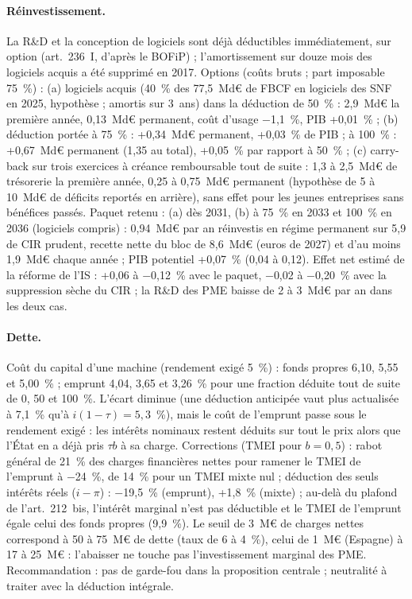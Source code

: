 \paragraph{Réinvestissement.} La R\&D et la conception de logiciels sont déjà déductibles immédiatement, sur option
(art.~236~I, d'après le BOFiP) ; l'amortissement sur douze mois des logiciels acquis a été supprimé en 2017. Options
(coûts bruts ; part imposable 75~\%) : (a) logiciels acquis (40~\% des 77,5~Md€ de FBCF en logiciels des SNF en 2025,
hypothèse ; amortis sur 3~ans) dans la déduction de 50~\% : 2,9~Md€ la première année, 0,13~Md€ permanent, coût d'usage
$-$1,1~\%, PIB +0,01~\% ; (b) déduction portée à 75~\% : +0,34~Md€ permanent, +0,03~\% de PIB ; à 100~\% : +0,67~Md€
permanent (1,35 au total), +0,05~\% par rapport à 50~\% ; (c) carry-back sur trois exercices à créance remboursable tout
de suite : 1,3 à 2,5~Md€ de trésorerie la première année, 0,25 à 0,75~Md€ permanent (hypothèse de 5 à 10~Md€ de déficits
reportés en arrière), sans effet pour les jeunes entreprises sans bénéfices passés. Paquet retenu : (a) dès 2031, (b) à
75~\% en 2033 et 100~\% en 2036 (logiciels compris) : 0,94~Md€ par an réinvestis en régime permanent sur 5,9 de CIR
prudent, recette nette du bloc de 8,6~Md€ (euros de 2027) et d'au moins 1,9~Md€ chaque année ; PIB potentiel +0,07~\%
(0,04 à 0,12). Effet net estimé de la réforme de l'IS : +0,06 à $-$0,12~\% avec le paquet, $-$0,02 à $-$0,20~\% avec la
suppression sèche du CIR ; la R\&D des PME baisse de 2 à 3~Md€ par an dans les deux cas.

\paragraph{Dette.} Coût du capital d'une machine (rendement exigé 5~\%) : fonds propres 6,10, 5,55 et 5,00~\% ; emprunt
4,04, 3,65 et 3,26~\% pour une fraction déduite tout de suite de 0, 50 et 100~\%. L'écart diminue (une déduction anticipée
vaut plus actualisée à 7,1~\% qu'à $i(1-\tau) = 5{,}3$~\%), mais le coût de l'emprunt passe sous le rendement exigé : les
intérêts nominaux restent déduits sur tout le prix alors que l'État en a déjà pris $\tau b$ à sa charge. Corrections
(TMEI pour $b = 0{,}5$) : rabot général de 21~\% des charges financières nettes pour ramener le TMEI de l'emprunt à
$-$24~\%, de 14~\% pour un TMEI mixte nul ; déduction des seuls intérêts réels ($i-\pi$) : $-$19,5~\% (emprunt), +1,8~\% (mixte) ;
au-delà du plafond de l'art.~212~bis, l'intérêt marginal n'est pas déductible et le TMEI de l'emprunt égale celui des
fonds propres (9,9~\%). Le seuil de 3~M€ de charges nettes correspond à 50 à 75~M€ de dette (taux de 6 à 4~\%), celui de
1~M€ (Espagne) à 17 à 25~M€ : l'abaisser ne touche pas l'investissement marginal des PME. Recommandation : pas de
garde-fou dans la proposition centrale ; neutralité à traiter avec la déduction intégrale.

